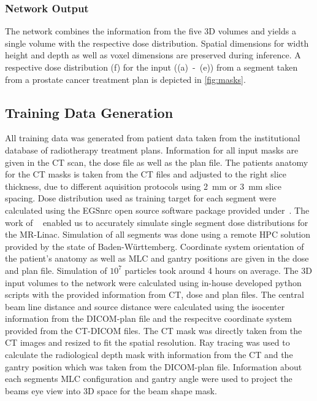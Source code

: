\subsubsection{Network Output}

The network combines the information from the five 3D volumes and yields a single volume with the respective dose distribution. Spatial dimensions for width height and depth as well as voxel dimensions are preserved during inference. A respective dose distribution (f) for the input ((a)~-~(e)) from a segment taken from a prostate cancer treatment plan is depicted in \autoref{fig:masks}.

\subsection{Training Data Generation}

All training data was generated from patient data taken from the institutional database of radiotherapy treatment plans. 
Information for all input masks are given in the CT scan, the dose file as well as the plan file. 
The patients anatomy for the CT masks is taken from the CT files and adjusted to the right slice thickness, due to different aquisition protocols using 2~mm or 3~mm slice spacing. 
Dose distribution used as training target for each segment were calculated using the EGSnrc open source software package provided under~\cite{noauthor_nrc-cnrcegsnrc_2021}. 
The work of \citeauthor{friedel_development_2019}~\cite{friedel_development_2019} enabled us to accurately simulate single segment dose distributions for the MR-Linac. 
Simulation of all segments was done using a remote \ac{HPC} solution provided by the state of Baden-Württemberg. 
Coordinate system orientation of the patient's anatomy as well as \ac{MLC} and gantry positions are given in the dose and plan file. 
Simulation of $10^7$ particles took around 4 hours on average.
The 3D input volumes to the network were calculated using in-house developed python scripts with the provided information from CT, dose and plan files. 
The central beam line distance and source distance were calculated using the isocenter information from the DICOM-plan file and the respecitve coordinate system provided from the CT-DICOM files.
The CT mask was directly taken from the CT images and resized to fit the spatial resolution. 
Ray tracing was used to calculate the radiological depth mask with information from the CT and the gantry position which was taken from the DICOM-plan file.
Information about each segments \acs{MLC} configuration and gantry angle were used to project the beams eye view into 3D space for the beam shape mask.

